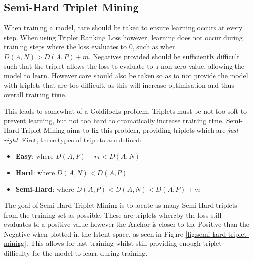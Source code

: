 \subsection{Semi-Hard Triplet Mining}\label{ch:ID,sec:SNNBackground,sub:SemiHardTripletMining}

When training a model, care should be taken to ensure learning occurs at every step. When using Triplet Ranking Loss however, learning does not occur during training steps where the loss evaluates to 0, such as when $D(A, N) > D(A, P) + m$. Negatives provided should be sufficiently difficult such that the triplet allows the loss to evaluate to a non-zero value, allowing the model to learn. However care should also be taken so as to not provide the model with triplets that are too difficult, as this will increase optimisation and thus overall training time. 

This leads to somewhat of a Goldilocks problem. Triplets must be not too soft to prevent learning, but not too hard to dramatically increase training time. Semi-Hard Triplet Mining aims to fix this problem, providing triplets which are \textit{just right}. First, three types of triplets are defined:

\begin{itemize}
	\item \textbf{Easy}: where $D(A, P) + m < D(A, N)$
	\item \textbf{Hard}: where $D(A, N) < D(A, P)$
	\item \textbf{Semi-Hard}: where $D(A, P) < D(A, N) < D(A, P) + m$
\end{itemize}

The goal of Semi-Hard Triplet Mining is to locate as many Semi-Hard triplets from the training set as possible. These are triplets whereby the loss still evaluates to a positive value however the Anchor is closer to the Positive than the Negative when plotted in the latent space, as seen in Figure \ref{fig:semi-hard-triplet-mining}. This allows for fast training whilst still providing enough triplet difficulty for the model to learn during training. 

